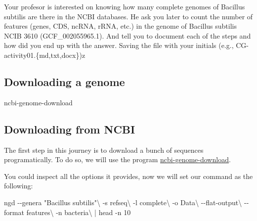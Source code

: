 \documentclass[
  letterpaper,
  DIV=11,
  numbers=noendperiod]{scrreprt}
\newenvironment{Shaded}{\begin{snugshade}}{\end{snugshade}}
\newcommand{\AttributeTok}[1]{\textcolor[rgb]{0.40,0.46,0.14}{#1}}
\newcommand{\DataTypeTok}[1]{\textcolor[rgb]{0.68,0.00,0.00}{#1}}
\newcommand{\ExtensionTok}[1]{\textcolor[rgb]{0.00,0.46,0.62}{#1}}
\newcommand{\FunctionTok}[1]{\textcolor[rgb]{0.28,0.35,0.67}{#1}}
\newcommand{\KeywordTok}[1]{\textcolor[rgb]{0.00,0.46,0.62}{#1}}
\newcommand{\NormalTok}[1]{\textcolor[rgb]{0.00,0.46,0.62}{#1}}
\newcommand{\StringTok}[1]{\textcolor[rgb]{0.13,0.47,0.30}{#1}}
\begin{document}
\begin{tcolorbox}[standard jigsaw,toptitle=1mm, colback=white, opacitybacktitle=0.6, title=\textcolor{quarto-callout-warning-color}{\faExclamationTriangle}\hspace{0.5em}{Challenge}, toprule=.15mm, bottomtitle=1mm, colbacktitle=quarto-callout-warning-color!10!white, titlerule=0mm, arc=.35mm, colframe=quarto-callout-warning-color-frame, rightrule=.15mm, opacityback=0, bottomrule=.15mm, leftrule=.75mm, coltitle=black, left=2mm]
Your profesor is interested on knowing how many complete genomes of
Bacillus subtilis are there in the NCBI databases. He ask you later to
count the number of features (genes, CDS, ncRNA, rRNA, etc.) in the
genome of Bacillus subtilis NCIB 3610 (GCF\_002055965.1). And tell you
to document each of the steps and how did you end up with the answer.
Saving the file with your initials (e.g.,
CG-activity01.\{md,txt,docx\})z
\end{tcolorbox}

\hypertarget{downloading-a-genome}{%
\subsection*{Downloading a genome}\label{downloading-a-genome}}

\begin{Shaded}
\begin{Highlighting}[]
\ExtensionTok{ncbi{-}genome{-}download}
\end{Highlighting}
\end{Shaded}

\hypertarget{downloading-from-ncbi}{%
\subsection*{Downloading from NCBI}\label{downloading-from-ncbi}}

The first step in this journey is to download a bunch of sequences
programatically. To do so, we will use the program
\href{https://github.com/kblin/ncbi-genome-download}{ncbi-genome-download}.

You could inspect all the options it provides, now we will set our
command as the following:

\begin{Shaded}
\begin{Highlighting}[]
\ExtensionTok{ngd} \AttributeTok{{-}{-}genera} \StringTok{"Bacillus subtilis"}\DataTypeTok{\textbackslash{}}
    \AttributeTok{{-}s}\NormalTok{ refseq}\DataTypeTok{\textbackslash{}}
    \AttributeTok{{-}l}\NormalTok{ complete}\DataTypeTok{\textbackslash{}}
    \AttributeTok{{-}o}\NormalTok{ Data}\DataTypeTok{\textbackslash{}}
    \AttributeTok{{-}{-}flat{-}output}\DataTypeTok{\textbackslash{}}
    \AttributeTok{{-}{-}format}\NormalTok{ features}\DataTypeTok{\textbackslash{}}
    \AttributeTok{{-}n}\NormalTok{ bacteria}\DataTypeTok{\textbackslash{}}
    \KeywordTok{|} \FunctionTok{head} \AttributeTok{{-}n}\NormalTok{ 10}
\end{Highlighting}
\end{Shaded}
\end{document}
